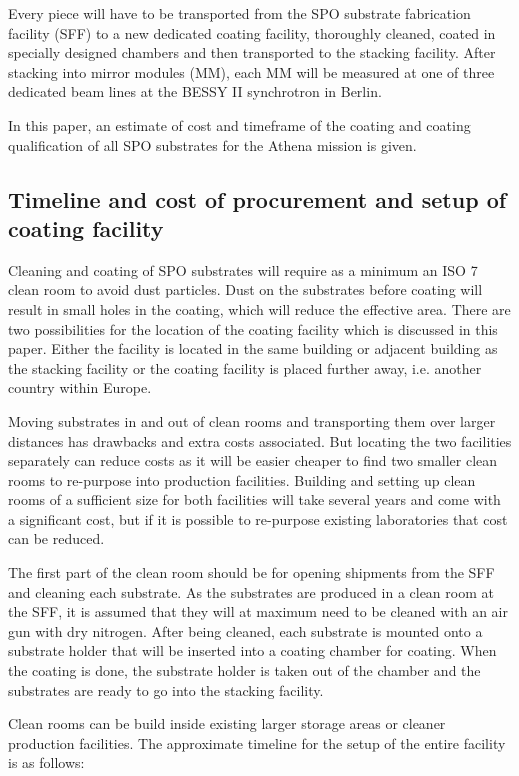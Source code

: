 Every piece will have to be transported from the SPO substrate fabrication facility (SFF) to a new dedicated coating facility, thoroughly cleaned, coated in specially designed chambers and then transported to the stacking facility. After stacking into mirror modules (MM), each MM will be measured at one of three dedicated beam lines at the BESSY II synchrotron in Berlin.

In this paper, an estimate of cost and timeframe of the coating and coating qualification of all SPO substrates for the Athena mission is given.

\subsection{Timeline and cost of procurement and setup of coating facility}

Cleaning and coating of SPO substrates will require as a minimum an ISO 7 clean room to avoid dust particles. Dust on the substrates before coating will result in small holes in the coating, which will reduce the effective area. There are two possibilities for the location of the coating facility which is discussed in this paper. Either the facility is located in the same building or adjacent building as the stacking facility or the coating facility is placed further away, i.e. another country within Europe.

Moving substrates in and out of clean rooms and transporting them over larger distances has drawbacks and extra costs associated. But locating the two facilities separately can reduce costs as it will be easier cheaper to find two smaller clean rooms to re-purpose into production facilities. Building and setting up clean rooms of a sufficient size for both facilities will take several years and come with a significant cost, but if it is possible to re-purpose existing laboratories that cost can be reduced.

The first part of the clean room should be for opening shipments from the SFF and cleaning each substrate. As the substrates are produced in a clean room at the SFF, it is assumed that they will at maximum need to be cleaned with an air gun with dry nitrogen. After being cleaned, each substrate is mounted onto a substrate holder that will be inserted into a coating chamber for coating. When the coating is done, the substrate holder is taken out of the chamber and the substrates are ready to go into the stacking facility.

Clean rooms can be build inside existing larger storage areas or cleaner production facilities. The approximate timeline for the setup of the entire facility is as follows:


